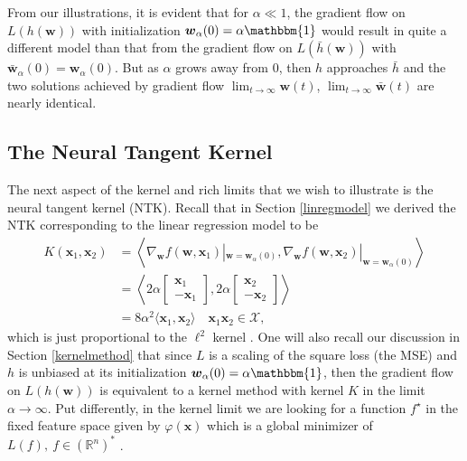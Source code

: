 \documentclass{article}
\begin{document}
From our illustrations, it is evident that for $\alpha \ll 1$, the gradient flow on $L(h(\boldsymbol{w}))$ with initialization $\boldsymbol{w}_{\alpha}(0) = \alpha \mathbbm{1}$ would result in quite a different model than that from the gradient flow on $L(\bar{h}(\boldsymbol{w}))$ with $\boldsymbol{\bar{w}}_{\alpha}(0) = \boldsymbol{w}_{\alpha}(0)$. But as $\alpha$ grows away from $0$, then $h$ approaches $\bar{h}$ and the two solutions achieved by gradient flow $\lim_{t \to \infty} \boldsymbol{w}(t)$,  $\lim_{t \to \infty} \boldsymbol{\bar{w}}(t)$ are nearly identical.


\subsection{The Neural Tangent Kernel}

The next aspect of the kernel and rich limits that we wish to illustrate is the neural tangent kernel (NTK). Recall that in Section \ref{linregmodel} we derived the NTK corresponding to the linear regression model to be
\begin{align*}
K(\boldsymbol{x}_1, \boldsymbol{x}_2) &= \left\langle \nabla_{\boldsymbol{w}}f(\boldsymbol{w}, \boldsymbol{x}_1)|_{\boldsymbol{w} = \boldsymbol{w}_{\alpha}(0)}, \nabla_{\boldsymbol{w}}f(\boldsymbol{w}, \boldsymbol{x}_2)|_{\boldsymbol{w} = \boldsymbol{w}_{\alpha}(0)} \right\rangle\\
&= \left\langle 2\alpha 
    \begin{bmatrix}
        \boldsymbol{x}_1\\
        -\boldsymbol{x}_1
    \end{bmatrix}, 2\alpha 
    \begin{bmatrix}
        \boldsymbol{x}_2\\
        -\boldsymbol{x}_2
    \end{bmatrix} \right\rangle\\
&= 8\alpha^2 \langle \boldsymbol{x}_1, \boldsymbol{x}_2 \rangle \quad \boldsymbol{x}_1 \boldsymbol{x}_2 \in \mathcal{X},
\end{align*}
which is just proportional to the $\ell^2$ kernel \cite{woodworth2020kernel}. One will also recall our discussion in Section \ref{kernelmethod} that since $L$ is a scaling of the square loss (the MSE) and $h$ is unbiased at its initialization $\boldsymbol{w}_{\alpha}(0) = \alpha \mathbbm{1}$, then the gradient flow on $L(h(\boldsymbol{w}))$ is equivalent to a kernel method with kernel $K$ in the limit $\alpha \rightarrow \infty$. Put differently, in the kernel limit we are looking for a function $f^{\star}$ in the fixed feature space given by $\varphi(\boldsymbol{x})$ which is a global minimizer of $L(f), \ f \in (\mathbb{R}^n)^*$ \cite{wei2019regularization}.
\end{document}
